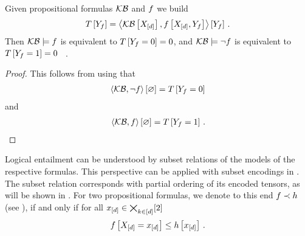 \begin{theorem}\label{the:entailmentContradictionContraction}
	Given propositional formulas $\mathcal{KB}$ and $f$ we build
	\begin{align*}
		T\left[Y_{f}\right]
		= \left\langle \mathcal{KB}\left[X_{[d]}\right],f\left[X_{[d]},Y_{f}\right]\right\rangle \left[ Y_{f} \right] \, .
	\end{align*}
	Then $\mathcal{KB}\models f$ is equivalent to $T\left[Y_{f}=0\right]=0$, and $\mathcal{KB}\models\lnot f$ is equivalent to $T\left[Y_{f}=1\right]=0$ \, .
\end{theorem}
\begin{proof}
	This follows from  using that
	\begin{align*}
		 \left\langle \mathcal{KB},\lnot f\right\rangle \left[ \varnothing \right] = T\left[Y_{f}=0\right]
	\end{align*}
	and
	\begin{align*}
		 \left\langle \mathcal{KB},f\right\rangle \left[ \varnothing \right] = T\left[Y_{f}=1\right] \, .
	\end{align*}
\end{proof}






Logical entailment can be understood by subset relations of the models of the respective formulas.
This perspective can be applied with subset encodings in .
The subset relation corresponds with partial ordering of its encoded tensors, as will be shown in .
For two propositional formulas, we denote to this end $f\prec h$ (see ), if and only if for all $x_{[d]}\in\bigtimes_{k\in[d]}[2]$
\begin{align*}
	f\left[X_{[d]}=x_{[d]}\right] \leq h\left[x_{[d]}\right]  \, .
\end{align*}

